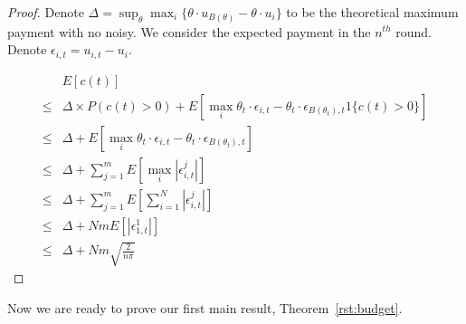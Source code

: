\documentclass{article}
\begin{document}
\begin{proof}
Denote $\Delta=\sup_{\theta}\max_{i}\{\theta\cdot u_{B(\theta)}-\theta\cdot u_{i}\}$ to be the theoretical maximum payment with no noisy. We consider the expected payment in the $n^{th}$ round. Denote $\epsilon_{i,t}=u_{i,t}-u_{i}$.

\begin{align}
&E[c(t)] \nonumber \\
\leq & \Delta \times P(c(t)>0) + E[\max_{i}\theta_t\cdot \epsilon_{i,t}-\theta_t\cdot \epsilon_{B(\theta_t),t}1\{c(t)>0\}] \nonumber \\
\leq & \Delta + E[\max_{i}\theta_t\cdot \epsilon_{i,t}-\theta_t\cdot \epsilon_{B(\theta_t),t}] \nonumber \\
\leq & \Delta + \sum_{j=1}^{m}E[\max_{i}|\epsilon_{i,t}^{j}|] \nonumber \\
\leq & \Delta + \sum_{j=1}^{m}E\left[\sum_{i=1}^{N}|\epsilon_{i,t}^{j}|\right] \nonumber \\
\leq & \Delta + Nm E[|\epsilon_{1,t}^{1}|] \nonumber \\
\leq & \Delta + Nm \sqrt{\frac{2}{n\pi}} \nonumber
\end{align}

\end{proof}



Now we are ready to prove our first main result, Theorem~\ref{rst:budget}.
\end{document}
